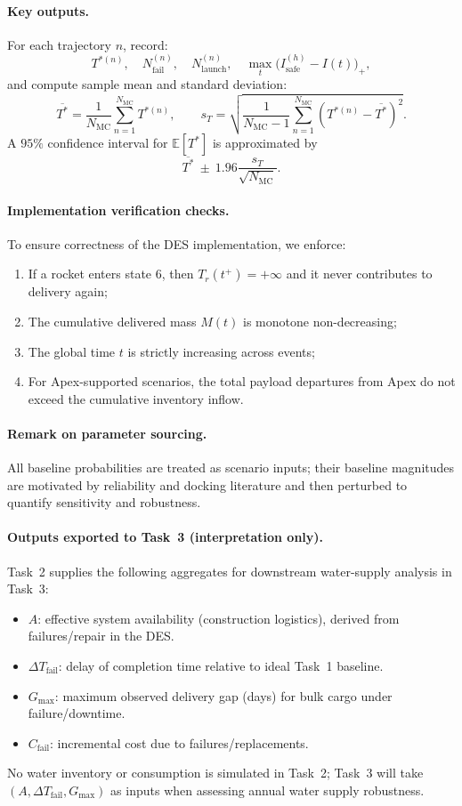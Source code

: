 ﻿\documentclass{mcmthesis}
\begin{document}
\paragraph{Key outputs.}
For each trajectory $n$, record:
\[
T^{*(n)},\quad N_{\text{fail}}^{(n)},\quad N_{\text{launch}}^{(n)},\quad
\max_t \big(I_{\text{safe}}^{(h)}-I(t)\big)_+,
\]
and compute sample mean and standard deviation:
\[
\overline{T^*}=\frac{1}{N_{\text{MC}}}\sum_{n=1}^{N_{\text{MC}}}T^{*(n)},\qquad
s_{T}=\sqrt{\frac{1}{N_{\text{MC}}-1}\sum_{n=1}^{N_{\text{MC}}}\left(T^{*(n)}-\overline{T^*}\right)^2 }.
\]
A $95\%$ confidence interval for $\mathbb{E}[T^*]$ is approximated by
\[
\overline{T^*}\ \pm\ 1.96\frac{s_T}{\sqrt{N_{\text{MC}}}}.
\]

\paragraph{Implementation verification checks.}
To ensure correctness of the DES implementation, we enforce:
\begin{enumerate}
\item If a rocket enters state $6$, then $T_r(t^+)=+\infty$ and it never contributes to delivery again;
\item The cumulative delivered mass $M(t)$ is monotone non-decreasing;
\item The global time $t$ is strictly increasing across events;
\item For Apex-supported scenarios, the total payload departures from Apex do not exceed the cumulative inventory inflow.
\end{enumerate}

\paragraph{Remark on parameter sourcing.}
All baseline probabilities are treated as scenario inputs; their baseline magnitudes are motivated by reliability
and docking literature \cite{nasa_launch_reliability,nasa_docking,nasa_landing} and then perturbed to quantify
sensitivity and robustness.

\paragraph{Outputs exported to Task~3 (interpretation only).}
Task~2 supplies the following aggregates for downstream water-supply analysis in Task~3:
\begin{itemize}
    \item $A$: effective system availability (construction logistics), derived from failures/repair in the DES.
    \item $\Delta T_{\text{fail}}$: delay of completion time relative to ideal Task~1 baseline.
    \item $G_{\max}$: maximum observed delivery gap (days) for bulk cargo under failure/downtime.
    \item $C_{\text{fail}}$: incremental cost due to failures/replacements.
\end{itemize}
No water inventory or consumption is simulated in Task~2; Task~3 will take $(A,\Delta T_{\text{fail}},G_{\max})$ as inputs when assessing annual water supply robustness.
\end{document}
